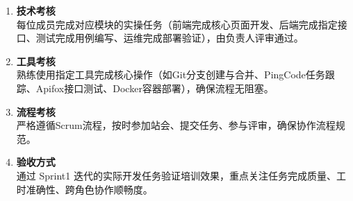 \begin{enumerate}
    \item \textbf{技术考核} \\
          每位成员完成对应模块的实操任务（前端完成核心页面开发、后端完成指定接口、测试完成用例编写、运维完成部署验证），由负责人评审通过。

    \item \textbf{工具考核} \\
          熟练使用指定工具完成核心操作（如Git分支创建与合并、PingCode任务跟踪、Apifox接口测试、Docker容器部署），确保流程无阻塞。

    \item \textbf{流程考核} \\
          严格遵循Scrum流程，按时参加站会、提交任务、参与评审，确保协作流程规范。

    \item \textbf{验收方式} \\
          通过 Sprint1 迭代的实际开发任务验证培训效果，重点关注任务完成质量、工时准确性、跨角色协作顺畅度。

\end{enumerate}